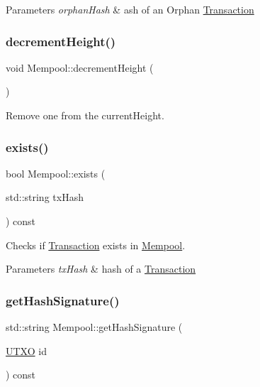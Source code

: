 \begin{DoxyParams}{Parameters}
{\em orphan\+Hash} & ash of an Orphan \mbox{\hyperlink{classTransaction}{Transaction}} \\
\hline
\end{DoxyParams}
\mbox{\label{classMempool_a6306559877a38806f0a3a90aa87f8655}} 
\subsubsection{\texorpdfstring{decrement\+Height()}{decrementHeight()}}
{\footnotesize\ttfamily void Mempool\+::decrement\+Height (\begin{DoxyParamCaption}{ }\end{DoxyParamCaption})}



Remove one from the current\+Height. 

\mbox{\label{classMempool_a3a11892f1519132f81204e57cc758666}} 
\subsubsection{\texorpdfstring{exists()}{exists()}}
{\footnotesize\ttfamily bool Mempool\+::exists (\begin{DoxyParamCaption}\item[{std\+::string}]{tx\+Hash }\end{DoxyParamCaption}) const}



Checks if \mbox{\hyperlink{classTransaction}{Transaction}} exists in \mbox{\hyperlink{classMempool}{Mempool}}. 


\begin{DoxyParams}{Parameters}
{\em tx\+Hash} & hash of a \mbox{\hyperlink{classTransaction}{Transaction}} \\
\hline
\end{DoxyParams}
\mbox{\label{classMempool_a93dc7c390ae5b561219cd654beddc36a}} 
\subsubsection{\texorpdfstring{get\+Hash\+Signature()}{getHashSignature()}}
{\footnotesize\ttfamily std\+::string Mempool\+::get\+Hash\+Signature (\begin{DoxyParamCaption}\item[{\mbox{\hyperlink{utxo_8hpp_a19091d002da03ec92277e19295ac4540}{U\+T\+XO}}}]{id }\end{DoxyParamCaption}) const}



